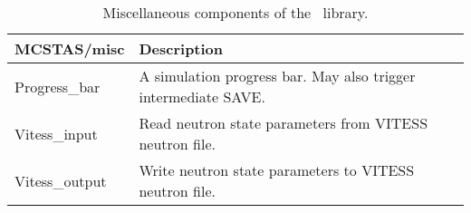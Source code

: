 \begin{table}
  \begin{center}
    {\let\my=\\
    \begin{tabular}{|p{}|p{}|}
      \hline
       {\bf MCSTAS/misc} & Description \\
       \hline
       Progress\_bar  &       A simulation
                      progress bar. May also trigger intermediate SAVE.\\
 Vitess\_input      &   Read neutron state
                      parameters from
                      VITESS neutron file.\\
 Vitess\_output    &  Write neutron state
     parameters to VITESS
                      neutron file.\\
      \hline
    \end{tabular}
    \caption{Miscellaneous components of the \MCS\ library.}
    \label{t:comp-misc}
    }
  \end{center}
\end{table}

